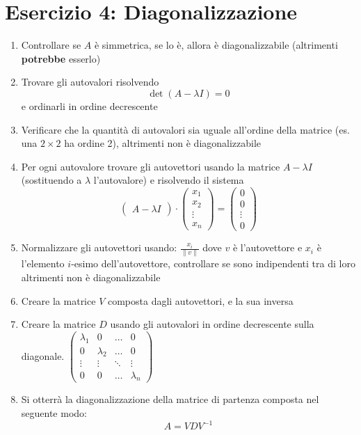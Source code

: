 \documentclass[10pt]{article}
\begin{document}
\section*{Esercizio 4: Diagonalizzazione}
\begin{enumerate}
    \item Controllare se $A$ è simmetrica, se lo è, allora è diagonalizzabile (altrimenti \textbf{potrebbe} esserlo)
    \item Trovare gli autovalori risolvendo \begin{equation*}
        \det(A-\lambda I)=0
    \end{equation*} e ordinarli in ordine decrescente
    \item Verificare che la quantità di autovalori sia uguale all'ordine della matrice (es. una $2\times 2$ ha ordine 2), altrimenti non è diagonalizzabile
    \item Per ogni autovalore trovare gli autovettori usando la matrice $A-\lambda I$ (sostituendo a $\lambda$ l'autovalore) e risolvendo il sistema \begin{equation*}
        \begin{pmatrix}
            A - \lambda I
        \end{pmatrix}
        \cdot
        \begin{pmatrix}
            x_{1} \\ x_{2} \\ \vdots \\ x_{n}
        \end{pmatrix}
        = \begin{pmatrix}
            0 \\ 0 \\ \vdots \\ 0
        \end{pmatrix}
    \end{equation*}
    \item Normalizzare gli autovettori usando: $\frac{x_{i}}{\lVert v\rVert}$ dove $v$ è l'autovettore e $x_{i}$ è l'elemento $i$-esimo dell'autovettore, controllare se sono indipendenti tra di loro altrimenti non è diagonalizzabile
    \item Creare la matrice $V$ composta dagli autovettori, e la sua inversa
    \item Creare la matrice $D$ usando gli autovalori in ordine decrescente sulla diagonale. $\begin{pmatrix}
        \lambda_{1} & 0 & \ldots & 0\\
        0 & \lambda_{2} & \ldots & 0\\
        \vdots & \vdots & \ddots & \vdots\\
        0 & 0 & \ldots & \lambda_{n}
    \end{pmatrix}$
    \item Si otterrà la diagonalizzazione della matrice di partenza composta nel seguente modo: \begin{equation*}
        A = VDV^{-1}
    \end{equation*}
\end{enumerate}
\end{document}
